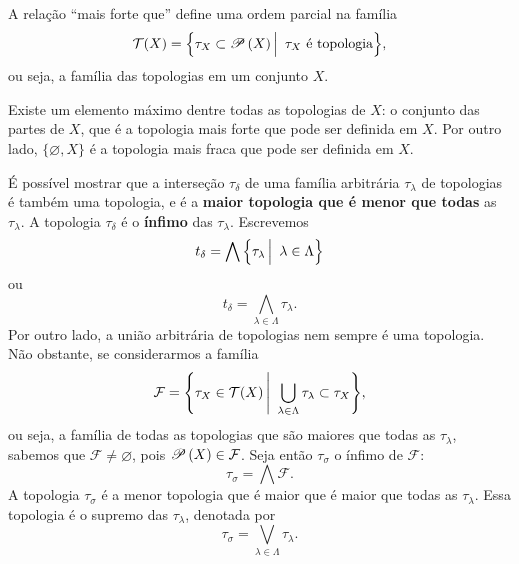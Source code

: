  \begin{obs}
 A relação ``mais forte que'' define uma ordem parcial
 na família
 \begin{equation*}
     \mathcal{T}(X)
     =
     \setsuchthat{ \tau_X \subset \parts X }{ \tau_X \text{ é topologia} },
 \end{equation*}
 ou seja, a família das topologias em um conjunto
 $X$.
 
 Existe um elemento máximo dentre todas as topologias de 
 $X$:
 o conjunto das partes de
 $X$,
 que é a topologia mais forte que pode ser definida em
 $X$. 
 Por outro lado, 
 $\{ \varnothing, X \}$
 é a topologia mais fraca que pode ser definida em 
 $X$.
 
 É possível mostrar que a interseção
 $\tau_{\delta}$
 de uma família arbitrária
 $\tau_{\lambda}$
 de topologias é também uma topologia, e é a 
 \textbf{maior topologia que é menor que todas} as
 $\tau_{\lambda}$.
 A topologia 
 $\tau_{\delta}$
 é o \textbf{ínfimo} das
 $\tau_{\lambda}$.
 Escrevemos
 \begin{equation*}
     t_{\delta} 
     =
     \bigwedge \setsuchthat{ \tau_{\lambda} }{ \lambda \in \Lambda }
 \end{equation*}
 ou
 \begin{equation*}
     t_{\delta} 
     =
     \bigwedge_{\lambda \in \Lambda} \tau_{\lambda}.
 \end{equation*}
 Por outro lado, a união arbitrária de topologias nem sempre é uma topologia.
 Não obstante, se considerarmos a família
 \begin{equation*}
     \mathcal{F}
     =
     \setsuchthat{ \tau_X \in \mathcal{T}(X) }{ \bigcup_{\lambda \in \Lambda} \tau_{\lambda} \subset \tau_X },
 \end{equation*}
 ou seja, a família de todas as topologias que são
 maiores que todas as 
 $\tau_{\lambda}$,
 sabemos que
 $\mathcal{F} \neq \varnothing$,
 pois 
 ${{\mathscr{P}}\left(X\right)} \in \mathcal{F}$.
 Seja então
 $\tau_{\sigma}$
 o ínfimo de
 $\mathcal{F}$:
 \begin{equation*}
     \tau_{\sigma}
     =
     \bigwedge \mathcal{F}.
 \end{equation*}
 A topologia
 $\tau_{\sigma}$
 é a menor topologia que é maior que é
 maior que todas as
 $\tau_{\lambda}$.
 Essa topologia é o supremo das
 $\tau_{\lambda}$,
 denotada por
 \begin{equation*}
     \tau_{\sigma}
     =
     \bigvee_{\lambda \in \Lambda} \tau_{\lambda}.
 \end{equation*}
 \end{obs}
 

